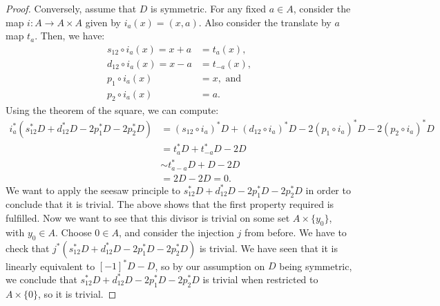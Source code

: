 \begin{proof}
	Conversely, assume that $D$ is symmetric. For any fixed $a\in A$, consider the map $i:A\rightarrow A\times A$ given by $i_a(x)=(x,a)$. Also consider the translate by $a$ map $t_a$. Then, we have:
	\begin{align*}
		s_{12}\circ i_a(x)=x+a&=t_a(x),\\
		d_{12}\circ i_a(x)=x-a&=t_{-a}(x),\\
		p_1\circ i_a(x)&=x,\text{ and}\\
		p_2\circ i_a(x)&=a.
	\end{align*}
	Using the theorem of the square, we can compute:
	\begin{align*}
		i_a^*(s_{12}^*D+d_{12}^*D-2p_1^*D-2p_2^*D)&=(s_{12}\circ i_a)^*D+(d_{12}\circ i_a)^*D-2(p_1\circ i_a)^*D-2(p_2\circ i_a)^*D\\
		&=t_a^*D+t_{-a}^*D-2D\\
		&\sim t_{a-a}^*D+D-2D\\
		&=2D-2D=0.
	\end{align*}
	We want to apply the seesaw principle to $s_{12}^*D+d_{12}^*D-2p_1^*D-2p_2^*D$ in order to conclude that it is trivial. The above shows that the first property required is fulfilled. Now we want to see that this divisor is trivial on some set $A\times\{y_0\}$, with $y_0\in A$. Choose $0\in A$, and consider the injection $j$ from before. We have to check that $j^*(s_{12}^*D+d_{12}^*D-2p_1^*D-2p_2^*D)$ is trivial. We have seen that it is linearly equivalent to $[-1]^*D-D$, so by our assumption on $D$ being symmetric, we conclude that $s_{12}^*D+d_{12}^*D-2p_1^*D-2p_2^*D$ is trivial when restricted to $A\times\{0\}$, so it is trivial.
\end{proof}